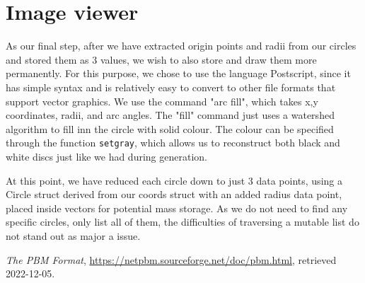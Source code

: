 \documentclass{article}
\begin{document}
	\section{Image viewer}
	As our final step, after we have extracted origin points and radii from our circles and stored them as 3 values, we wish to also store and draw them more permanently.
	For this purpose, we chose to use the language Postscript, since it has simple syntax and is relatively easy to convert to other file formats that support vector graphics.
	We use the command "arc fill", which takes x,y coordinates, radii, and arc angles. The "fill" command just uses a watershed algorithm to fill inn the circle with solid colour. The colour can be specified through the function \texttt{setgray}, which allows us to reconstruct both black and white discs just like we had during generation.
	
	At this point, we have reduced each circle down to just 3 data points, using a Circle struct derived from our coords struct with an added radius data point, placed inside vectors for potential mass storage. As we do not need to find any specific circles, only list all of them, the difficulties of traversing a mutable list do not stand out as major a issue.


\begin{thebibliography}{1}
		
	 \textit{The PBM Format}, \href{url}{https://netpbm.sourceforge.net/doc/pbm.html}, retrieved 2022-12-05.

\end{thebibliography}
\end{document}
